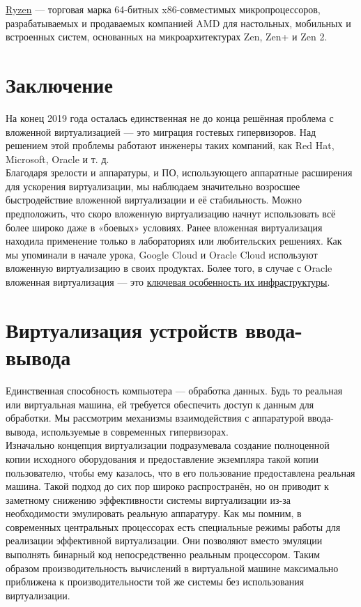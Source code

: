 \documentclass[14pt, a4paper]{article}
\begin{document}
\href{https://ru.wikipedia.org/wiki/Ryzen}{Ryzen} — торговая марка 64-битных x86-совместимых микропроцессоров, разрабатываемых и
продаваемых компанией AMD для настольных, мобильных и встроенных систем, основанных на
микроархитектурах Zen, Zen+ и Zen 2.

\section*{Заключение}

На конец 2019 года осталась единственная не до конца решённая проблема с вложенной
виртуализацией — это миграция гостевых гипервизоров. Над решением этой проблемы работают
инженеры таких компаний, как Red Hat, Microsoft, Oracle и т. д.\\

Благодаря зрелости и аппаратуры, и ПО, использующего аппаратные расширения для ускорения
виртуализации, мы наблюдаем значительно возросшее быстродействие вложенной виртуализации и
её стабильность. Можно предположить, что скоро вложенную виртуализацию начнут использовать всё
более широко даже в «боевых» условиях. Ранее вложенная виртуализация находила применение
только в лабораториях или любительских решениях. Как мы упоминали в начале урока, Google Cloud
и Oracle Cloud используют вложенную виртуализацию в своих продуктах. Более того, в случае с Oracle
вложенная виртуализация — это \href{https://blogs.oracle.com/}{ключевая особенность их инфраструктуры}.\\

\section*{Виртуализация устройств ввода-вывода}

Единственная способность компьютера — обработка данных. Будь то реальная или виртуальная
машина, ей требуется обеспечить доступ к данным для обработки. Мы рассмотрим механизмы
взаимодействия с аппаратурой ввода-вывода, используемые в современных гипервизорах.\\

Изначально концепция виртуализации подразумевала создание полноценной копии исходного
оборудования и предоставление экземпляра такой копии пользователю, чтобы ему казалось, что в его
пользование предоставлена реальная машина. Такой подход до сих пор широко распространён, но он
приводит к заметному снижению эффективности системы виртуализации из-за необходимости
эмулировать реальную аппаратуру. Как мы помним, в современных центральных процессорах есть
специальные режимы работы для реализации эффективной виртуализации. Они позволяют вместо
эмуляции выполнять бинарный код непосредственно реальным процессором. Таким образом
производительность вычислений в виртуальной машине максимально приближена к
производительности той же системы без использования виртуализации.\\
\end{document}
